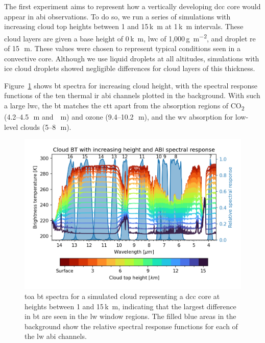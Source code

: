 The first experiment aims to represent how a vertically developing \acrshort{dcc} core would appear in \acrshort{abi} observations.
To do so, we run a series of simulations with increasing cloud top heights between 1 and 15\,\unit{k m} at 1\,\unit{k m} intervals.
These cloud layers are given a base height of 0\,\unit{k m}, \acrfull{lwc} of 1,000\,\unit{g m^{-2}}, and droplet \acrfull{re} of 15\,\unit{\mu m}.
These values were chosen to represent typical conditions seen in a convective core.
Although we use liquid droplets at all altitudes, simulations with ice cloud droplets showed negligible differences for cloud layers of this thickness.

Figure~\ref{fig:cloud_height_spectra} shows \acrshort{bt} spectra for increasing cloud height, with the spectral response functions of the ten thermal \acrshort{ir} \acrshort{abi} channels plotted in the background.
With such a large \acrshort{lwc}, the \acrshort{bt} matches the \acrshort{ctt} apart from the absorption regions of CO\textsubscript{2} (4.2--4.5\,\unit{\mu m} and \,\unit{\mu m}) and ozone (9.4--10.2\,\unit{\mu m}), and the \acrshort{wv} absorption for low-level clouds (5--8\,\unit{\mu m}).


\begin{figure}[tp]
    \includegraphics[width=\textwidth]{figures/chapter1_05.png}
    \caption[
    \acrshort{toa} \acrshort{bt} spectra for a simulated cloud representing a \acrshort{dcc} core at heights between 1 and 15\,\unit{k m}
    ]{
    \acrshort{toa} \acrshort{bt} spectra for a simulated cloud representing a \acrshort{dcc} core at heights between 1 and 15\,\unit{k m}, indicating that the largest difference in \acrshort{bt} are seen in the \acrshort{lw} window regions. The filled blue areas in the background show the relative spectral response functions for each of the \acrshort{lw} \acrshort{abi} channels.
    }
    \label{fig:cloud_height_spectra}
\end{figure}


